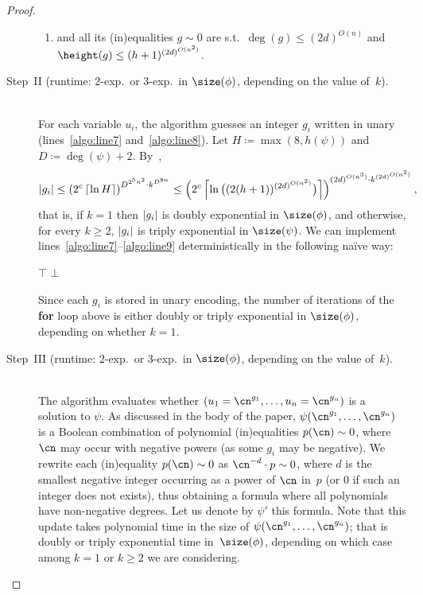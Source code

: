 \begin{proof}
\begin{description}
\begin{enumerate}
        \item and all its (in)equalities $g \sim 0$ are s.t.~$\deg(g) \leq (2d)^{O(n)}$ and $\height(g) \leq (h+1)^{(2d)^{O(n^2)}}$.
      \end{enumerate}
    \item[Step~II (runtime: 2-exp.~or 3-exp.~in $\size(\phi)$, depending on the value of~$k$).]~\\
      For each variable $u_i$, the algorithm guesses an integer $g_i$ written in unary (lines~\ref{algo:line7} and~\ref{algo:line8}). Let $H \coloneqq \max(8,h(\psi))$ and $D \coloneqq \deg(\psi)+2$.
      By~, 
      \begin{align*}
        \left|g_i\right| 
        & \leq \left(2^c \left\lceil\ln H\right\rceil\right)^{D^{2^5 n^2} \cdot k^{D^{8n}}} 
        \leq \left(2^c \left\lceil\ln \big((2(h+1))^{(2d)^{O(n^2)}}\big)\right\rceil\right)^{(2d)^{O(n^3)} \cdot k^{(2d)^{O(n^2)}}},
      \end{align*}
      that is, if $k = 1$ then $\left|g_i\right|$ is doubly exponential in $\size(\phi)$, and otherwise, for every $k \geq 2$, $\left|g_i\right|$ is triply exponential in $\size(\psi)$.
      We can implement lines~\ref{algo:line7}--\ref{algo:line9} deterministically in the following na\"ive way: 
      \begin{algorithmic}[1]
        \setcounter{ALG@line}{6}
            \State \myreturn $\top$
          \EndIf
        \EndFor
        \State \myreturn $\bot$
      \end{algorithmic}
      Since each $g_i$ is stored in unary encoding, the number of iterations of
      the \textbf{for} loop above is either doubly or triply exponential in
      $\size(\phi)$, depending on whether $k = 1$.
      \item[Step~III (runtime: $2$-exp.~or $3$-exp.~in $\size(\phi)$, depending
      on the value of~$k$).]~\\
      The algorithm evaluates whether $(u_1 = \cn^{g_1}, \dots, u_n =
      \cn^{g_n})$ is a solution to $\psi$. As discussed in the body of the
      paper, $\psi(\cn^{g_1},\dots,\cn^{g_n})$ is a Boolean combination of
      polynomial (in)equalities $p(\cn) \sim 0$, where $\cn$ may occur with
      negative powers (as some $g_i$ may be negative). We rewrite each
      (in)equality $p(\cn) \sim 0$ as $\cn^{-d} \cdot p \sim 0$, where $d$ is
      the smallest negative integer occurring as a power of $\cn$ in~$p$ (or $0$
      if such an integer does not exists), thus obtaining a formula where all
      polynomials have non-negative degrees. Let us denote by $\psi'$ this
      formula. Note that this update takes polynomial time in the size of
      $\psi(\cn^{g_1},\dots,\cn^{g_n})$; that is doubly or triply exponential
      time in~$\size(\phi)$, depending on which case among $k = 1$ or $k \geq 2$
      we are considering.


\end{description}
\end{proof}
